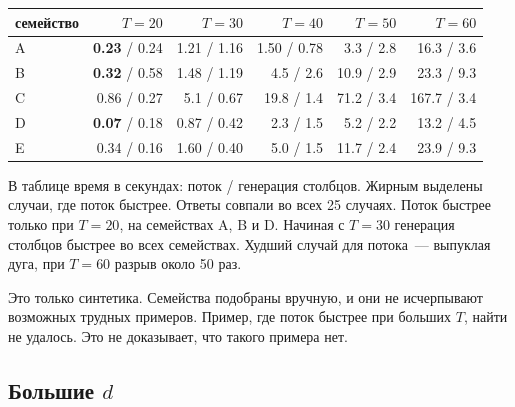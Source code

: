 \documentclass[a4paper,11pt]{article}
\theoremstyle{plain}
\theoremstyle{definition}
\theoremstyle{remark}
\begin{document}
\begin{center}
\begin{tabular}{lrrrrr}
    \toprule
    семейство & $T=20$ & $T=30$ & $T=40$ & $T=50$ & $T=60$ \\
    \midrule
    A & \textbf{0.23} / 0.24 & 1.21 / 1.16 & 1.50 / 0.78 & 3.3 / 2.8 & 16.3 / 3.6 \\
    B & \textbf{0.32} / 0.58 & 1.48 / 1.19 & 4.5 / 2.6 & 10.9 / 2.9 & 23.3 / 9.3 \\
    C & 0.86 / 0.27 & 5.1 / 0.67 & 19.8 / 1.4 & 71.2 / 3.4 & 167.7 / 3.4 \\
    D & \textbf{0.07} / 0.18 & 0.87 / 0.42 & 2.3 / 1.5 & 5.2 / 2.2 & 13.2 / 4.5 \\
    E & 0.34 / 0.16 & 1.60 / 0.40 & 5.0 / 1.5 & 11.7 / 2.4 & 23.9 / 9.3 \\
    \bottomrule
\end{tabular}
\end{center}
В таблице время в секундах: поток / генерация столбцов. Жирным выделены случаи, где поток быстрее. Ответы совпали во всех 25 случаях. Поток быстрее только при $T=20$, на семействах A, B и D. Начиная с $T=30$ генерация столбцов быстрее во всех семействах. Худший случай для потока~--- выпуклая дуга, при $T=60$ разрыв около 50 раз.

Это только синтетика. Семейства подобраны вручную, и они не исчерпывают возможных трудных примеров. Пример, где поток быстрее при больших $T$, найти не удалось. Это не доказывает, что такого примера нет.

\subsection{Большие $d$}
\end{document}
